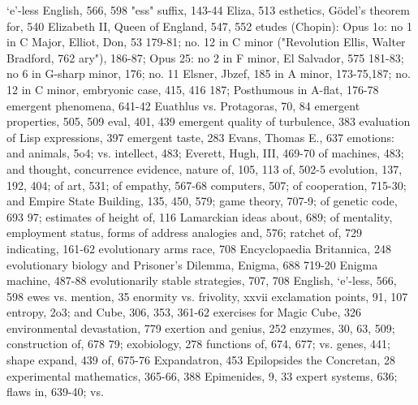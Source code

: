 `e'-less English, 566, 598                        "ess" suffix, 143-44
Eliza, 513                                        esthetics, Gödel’s theorem for, 540
Elizabeth II, Queen of England, 547, 552          etudes (Chopin): Opus 1o: no 1 in C Major,
Elliot, Don, 53                                    179-81; no. 12 in C minor ("Revolution
Ellis, Walter Bradford, 762                        ary"), 186-87; Opus 25: no 2 in F minor,
El Salvador, 575                                   181-83; no 6 in G-sharp minor, 176; no. 11
Elsner, Jbzef, 185                                 in A minor, 173-75,187; no. 12 in C minor,
embryonic case, 415, 416                           187; Posthumous in A-flat, 176-78
emergent phenomena, 641-42                        Euathlus vs. Protagoras, 70, 84
emergent properties, 505, 509                     eval, 401, 439
emergent quality of turbulence, 383               evaluation of Lisp expressions, 397
emergent taste, 283                               Evans, Thomas E., 637
emotions: and animals, 5o4; vs. intellect, 483;   Everett, Hugh, III, 469-70
 of machines, 483; and thought, concurrence       evidence, nature of, 105, 113
 of, 502-5                                        evolution, 137, 192, 404; of art, 531; of
empathy, 567-68                                    computers, 507; of cooperation, 715-30; and
Empire State Building, 135, 450, 579;              game theory, 707-9; of genetic code, 693 97;
 estimates of height of, 116                       Lamarckian ideas about, 689; of mentality,
employment status, forms of address                analogies and, 576; ratchet of, 729
 indicating, 161-62                               evolutionary arms race, 708
Encyclopaedia Britannica, 248                     evolutionary biology and Prisoner's Dilemma,
Enigma, 688                                        719-20
Enigma machine, 487-88                            evolutionarily stable strategies, 707, 708
English, `e'-less, 566, 598                       ewes vs. mention, 35
enormity vs. frivolity, xxvii                     exclamation points, 91, 107
entropy, 2o3; and Cube, 306, 353, 361-62          exercises for Magic Cube, 326
environmental devastation, 779                    exertion and genius, 252
enzymes, 30, 63, 509; construction of, 678 79;    exobiology, 278
 functions of, 674, 677; vs. genes, 441; shape    expand, 439
 of, 675-76                                       Expandatron, 453
Epilopsides the Concretan, 28                     experimental mathematics, 365-66, 388
Epimenides, 9, 33                                 expert systems, 636; flaws in, 639-40; vs.
